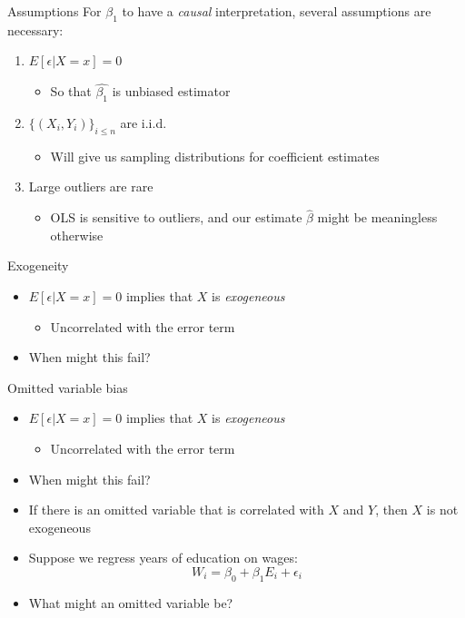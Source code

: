 \documentclass[aspectratio=169]{beamer}
\begin{document}
\begin{frame}{Assumptions}
    For $\beta_1$ to have a \textit{causal} interpretation, several assumptions are necessary:
    \begin{enumerate}
        \item $E[\epsilon | X=x] = 0$ 
        \begin{itemize}
            \item So that $\hat{\beta_1}$ is unbiased estimator
        \end{itemize}
        \item $\{ (X_i, Y_i) \}_{i \leq n}$ are i.i.d. 
        \begin{itemize}
            \item Will give us sampling distributions for coefficient estimates
        \end{itemize}
        \item Large outliers are rare 
        \begin{itemize}
            \item OLS is sensitive to outliers, and our estimate $\hat{\beta}$ might be meaningless otherwise
        \end{itemize}
    \end{enumerate}
\end{frame}

\begin{frame}{Exogeneity}
    \begin{itemize}
        \item $E[\epsilon | X=x] = 0$ implies that $X$ is \textit{exogeneous}
        \begin{itemize}
            \item Uncorrelated with the error term
        \end{itemize}
        \item When might this fail?
    \end{itemize}
\end{frame}

\begin{frame}{Omitted variable bias}
    \begin{itemize}
        \item $E[\epsilon | X=x] = 0$ implies that $X$ is \textit{exogeneous}
        \begin{itemize}
            \item Uncorrelated with the error term
        \end{itemize}
        \item When might this fail?
        \item If there is an omitted variable that is correlated with $X$ and $Y$, then $X$ is not exogeneous
        \item Suppose we regress years of education on wages:
        $$
            W_i = \beta_0 + \beta_1 E_i + \epsilon_i
        $$
        \item What might an omitted variable be?
    \end{itemize}
\end{frame}
\end{document}
